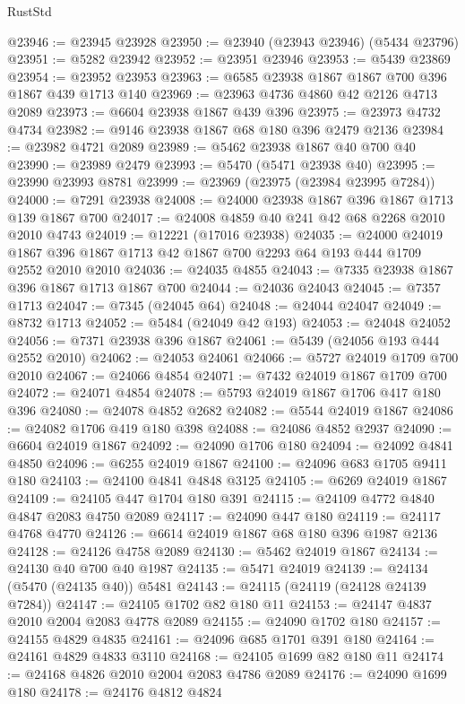 \begin{lexlean}{RustStd}
\begin{coremodule}
{\begin{coremodule}
{{{{{{{{{{{{{{{{{{{{{{{{{{{{{{{@23946 := @23945 @23928
@23950 := @23940 (@23943 @23946) (@5434 @23796)
@23951 := @5282 @23942
@23952 := @23951 @23946
@23953 := @5439 @23869
@23954 := @23952 @23953
@23963 := @6585 @23938 @1867 @1867 @700 @396 @1867 @439 @1713 @140
@23969 := @23963 @4736 @4860 @42 @2126 @4713 @2089
@23973 := @6604 @23938 @1867 @439 @396
@23975 := @23973 @4732 @4734
@23982 := @9146 @23938 @1867 @68 @180 @396 @2479 @2136
@23984 := @23982 @4721 @2089
@23989 := @5462 @23938 @1867 @40 @700 @40
@23990 := @23989 @2479
@23993 := @5470 (@5471 @23938 @40)
@23995 := @23990 @23993 @8781
@23999 := @23969 (@23975 (@23984 @23995 @7284))
@24000 := @7291 @23938
@24008 := @24000 @23938 @1867 @396 @1867 @1713 @139 @1867 @700
@24017 := @24008 @4859 @40 @241 @42 @68 @2268 @2010 @2010 @4743
@24019 := @12221 (@17016 @23938)
@24035 := @24000
    @24019
    @1867
    @396
    @1867
    @1713
    @42
    @1867
    @700
    @2293
    @64
    @193
    @444
    @1709
    @2552
    @2010
    @2010
@24036 := @24035 @4855
@24043 := @7335 @23938 @1867 @396 @1867 @1713 @1867 @700
@24044 := @24036 @24043
@24045 := @7357 @1713
@24047 := @7345 (@24045 @64)
@24048 := @24044 @24047
@24049 := @8732 @1713
@24052 := @5484 (@24049 @42 @193)
@24053 := @24048 @24052
@24056 := @7371 @23938 @396 @1867
@24061 := @5439 (@24056 @193 @444 @2552 @2010)
@24062 := @24053 @24061
@24066 := @5727 @24019 @1709 @700 @2010
@24067 := @24066 @4854
@24071 := @7432 @24019 @1867 @1709 @700
@24072 := @24071 @4854
@24078 := @5793 @24019 @1867 @1706 @417 @180 @396
@24080 := @24078 @4852 @2682
@24082 := @5544 @24019 @1867
@24086 := @24082 @1706 @419 @180 @398
@24088 := @24086 @4852 @2937
@24090 := @6604 @24019 @1867
@24092 := @24090 @1706 @180
@24094 := @24092 @4841 @4850
@24096 := @6255 @24019 @1867
@24100 := @24096 @683 @1705 @9411 @180
@24103 := @24100 @4841 @4848 @3125
@24105 := @6269 @24019 @1867
@24109 := @24105 @447 @1704 @180 @391
@24115 := @24109 @4772 @4840 @4847 @2083 @4750 @2089
@24117 := @24090 @447 @180
@24119 := @24117 @4768 @4770
@24126 := @6614 @24019 @1867 @68 @180 @396 @1987 @2136
@24128 := @24126 @4758 @2089
@24130 := @5462 @24019 @1867
@24134 := @24130 @40 @700 @40 @1987
@24135 := @5471 @24019
@24139 := @24134 (@5470 (@24135 @40)) @5481
@24143 := @24115 (@24119 (@24128 @24139 @7284))
@24147 := @24105 @1702 @82 @180 @11
@24153 := @24147 @4837 @2010 @2004 @2083 @4778 @2089
@24155 := @24090 @1702 @180
@24157 := @24155 @4829 @4835
@24161 := @24096 @685 @1701 @391 @180
@24164 := @24161 @4829 @4833 @3110
@24168 := @24105 @1699 @82 @180 @11
@24174 := @24168 @4826 @2010 @2004 @2083 @4786 @2089
@24176 := @24090 @1699 @180
@24178 := @24176 @4812 @4824
}}}}}}}}}}}}}}}}}}}}}}}}}}}}}}}
\end{coremodule}}
\end{coremodule}
\end{lexlean}
